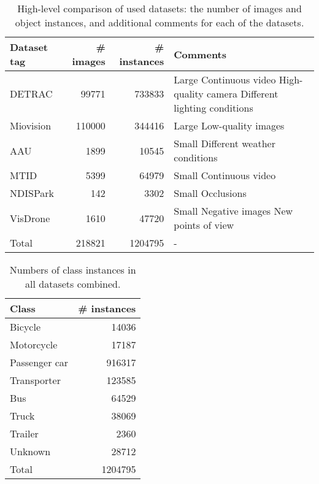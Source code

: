 \begin{table}[h]
\centering
\begin{tabular}{|l|rr|p{5cm}|}
    \hline
    Dataset tag & \# images & \# instances & Comments \\
    \hline
    DETRAC      &  \num{99771}  & \num{733833} & Large \newline Continuous video \newline High-quality camera \newline Different lighting conditions \\
    \hline
    Miovision   &  \num{110000} & \num{344416} & Large \newline Low-quality images \\
    \hline
    AAU         &    \num{1899} &  \num{10545} & Small \newline Different weather conditions \\
    \hline
    MTID        &    \num{5399} &  \num{64979} & Small \newline Continuous video \\
    \hline
    NDISPark    &     \num{142} &   \num{3302} & Small \newline Occlusions \\
    \hline
    VisDrone    &    \num{1610} &  \num{47720} & Small \newline Negative images \newline New points of view \\
    \hline
    \hline
    Total       &  \num{218821} & \num{1204795} & - \\
    \hline
\end{tabular}
\caption{High-level comparison of used datasets: the number of images and object instances, and additional comments for each of the datasets.}
\label{DatasetsSummary}
\end{table}

\begin{table}[h]
\centering
\begin{tabular}{|l|r|}
    \hline
    Class         & \# instances \\
    \hline
    Bicycle       &  \num{14036} \\
    Motorcycle    &  \num{17187} \\
    Passenger car & \num{916317} \\
    Transporter   & \num{123585} \\
    Bus           &  \num{64529} \\
    Truck         &  \num{38069} \\
    Trailer       &   \num{2360} \\
    Unknown       &  \num{28712} \\
    \hline
    \hline
    Total         & \num{1204795} \\
    \hline
\end{tabular}
\caption{Numbers of class instances in all datasets combined.}
\label{DatasetsCounts}
\end{table}


